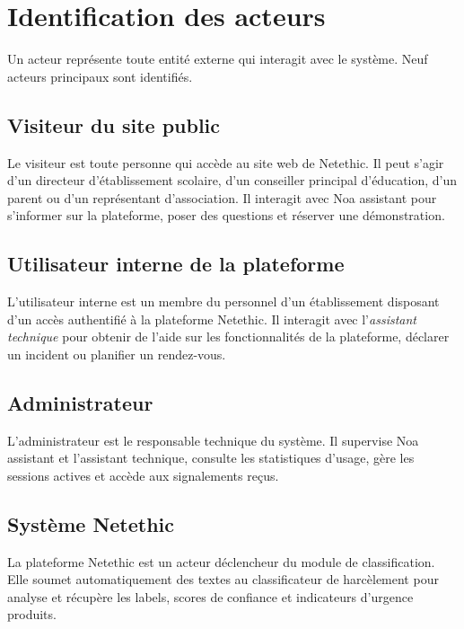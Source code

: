 \section{Identification des acteurs}

Un acteur représente toute entité externe qui interagit avec le système.
Neuf acteurs principaux sont identifiés.

\subsection{Visiteur du site public}

Le visiteur est toute personne qui accède au site web de Netethic.
Il peut s'agir d'un directeur d'établissement scolaire, d'un conseiller principal d'éducation,
d'un parent ou d'un représentant d'association.
Il interagit avec Noa assistant pour s'informer sur la plateforme, poser des questions
et réserver une démonstration.

\subsection{Utilisateur interne de la plateforme}

L'utilisateur interne est un membre du personnel d'un établissement disposant
d'un accès authentifié à la plateforme Netethic.
Il interagit avec l'\textit{assistant technique} pour obtenir de l'aide sur
les fonctionnalités de la plateforme, déclarer un incident ou planifier un rendez-vous.

\subsection{Administrateur}

L'administrateur est le responsable technique du système.
Il supervise Noa assistant et l'assistant technique, consulte les statistiques d'usage,
gère les sessions actives et accède aux signalements reçus.

\subsection{Système Netethic}

La plateforme Netethic est un acteur déclencheur du module de classification.
Elle soumet automatiquement des textes au classificateur de harcèlement pour analyse
et récupère les labels, scores de confiance et indicateurs d'urgence produits.

